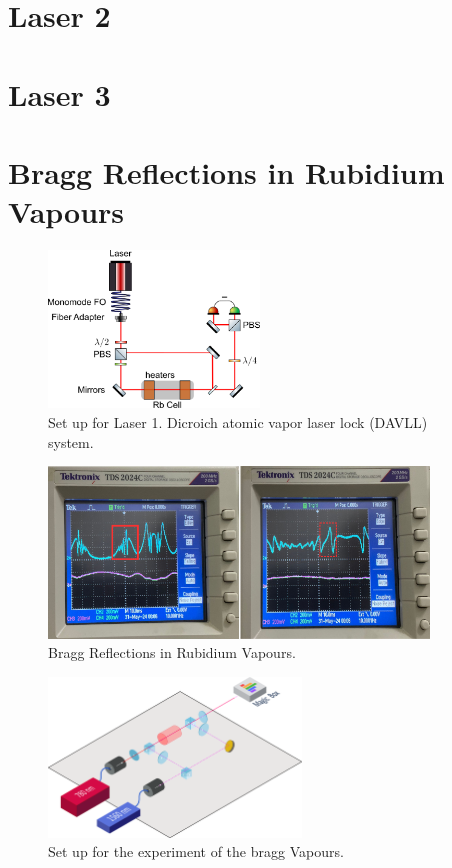 \documentclass[10pt]{article}
\begin{document}
\section*{Laser 2}

\section*{Laser 3}


\section*{Bragg Reflections in Rubidium Vapours}




\begin{figure}[h]
    \centering
    \includegraphics[width=0.5\textwidth]{img/rect5909.png}
    \caption{Set up for Laser 1. Dicroich atomic vapor laser lock (DAVLL) system.}
    \label{fig:laser1}
\end{figure}

\begin{figure}[h]
    \centering
    \includegraphics[width=0.9\textwidth]{img/image1.png}
    \caption{Bragg Reflections in Rubidium Vapours.}
    \label{fig:braggref}
\end{figure}

\begin{figure}
    \centering
    \includegraphics[width=0.6\textwidth]{img/path16176.png}
    \caption{Set up for the experiment of the bragg Vapours.}
    \label{fig:braggref1}
\end{figure}
\end{document}
